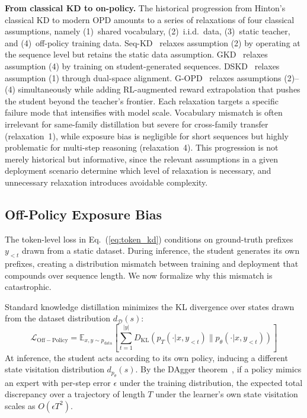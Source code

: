 \documentclass{article} %
\newcommand{\E}{\mathbb{E}}
\newcommand{\KL}{D_{\mathrm{KL}}}
\newcommand{\ptheta}{p_\theta}
\newcommand{\pteacher}{p_T}
\newcommand{\pdata}{p_{\mathrm{data}}}
\newcommand{\loss}{\mathcal{L}}
\begin{document}
\textbf{From classical KD to on-policy.} The historical progression from Hinton's classical KD to modern OPD amounts to a series of relaxations of four classical assumptions, namely (1)~shared vocabulary, (2)~i.i.d.\ data, (3)~static teacher, and (4)~off-policy training data. Seq-KD~\citep{1606.07947} relaxes assumption (2) by operating at the sequence level but retains the static data assumption. GKD~\citep{2306.13649} relaxes assumption (4) by training on student-generated sequences. DSKD~\citep{2504.11426} relaxes assumption (1) through dual-space alignment. G-OPD~\citep{2602.12125} relaxes assumptions (2)--(4) simultaneously while adding RL-augmented reward extrapolation that pushes the student beyond the teacher's frontier. Each relaxation targets a specific failure mode that intensifies with model scale. Vocabulary mismatch is often irrelevant for same-family distillation but severe for cross-family transfer (relaxation~1), while exposure bias is negligible for short sequences but highly problematic for multi-step reasoning (relaxation~4). This progression is not merely historical but informative, since the relevant assumptions in a given deployment scenario determine which level of relaxation is necessary, and unnecessary relaxation introduces avoidable complexity.

\subsection{Off-Policy Exposure Bias}

The token-level loss in Eq.~(\ref{eq:token_kd}) conditions on ground-truth prefixes $y_{<t}$ drawn from a static dataset. During inference, the student generates its own prefixes, creating a distribution mismatch between training and deployment that compounds over sequence length. We now formalize why this mismatch is catastrophic.

Standard knowledge distillation minimizes the KL divergence over states drawn from the dataset distribution $d_{\mathcal{D}}(s)$:
\begin{equation*}
    \loss_{\mathrm{Off-Policy}} = \E_{x, y \sim \pdata} \left[ \sum_{t=1}^{|y|} \KL(\pteacher(\cdot | x, y_{<t}) \parallel \ptheta(\cdot | x, y_{<t})) \right]
\end{equation*}
At inference, the student acts according to its own policy, inducing a different state visitation distribution $d_{\ptheta}(s)$. By the DAgger theorem~\citep{1011.0686}, if a policy mimics an expert with per-step error $\epsilon$ under the training distribution, the expected total discrepancy over a trajectory of length $T$ under the learner's own state visitation scales as $O(\epsilon T^2)$.
\end{document}
